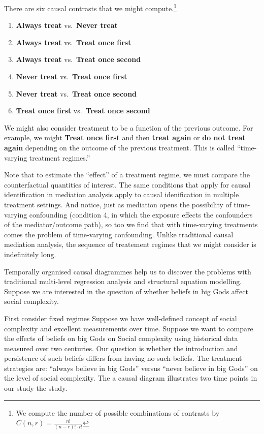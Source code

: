 \documentclass[
  singlecolumn]{report}
\providecommand{\tightlist}{%
  \setlength{\itemsep}{0pt}\setlength{\parskip}{0pt}}\usepackage{longtable,booktabs,array}
\begin{document}
There are six causal contrasts that we might compute.\footnote{We
  compute the number of possible combinations of contrasts by
  \(C(n, r) = \frac{n!}{(n-r)! \cdot r!}\)}

\begin{enumerate}
\def\labelenumi{\arabic{enumi}.}
\tightlist
\item
  \textbf{Always treat} vs.~\textbf{Never treat}
\item
  \textbf{Always treat} vs.~\textbf{Treat once first}
\item
  \textbf{Always treat} vs.~\textbf{Treat once second}
\item
  \textbf{Never treat} vs.~\textbf{Treat once first}
\item
  \textbf{Never treat} vs.~\textbf{Treat once second}
\item
  \textbf{Treat once first} vs.~\textbf{Treat once second}
\end{enumerate}

We might also consider treatment to be a function of the previous
outcome. For example, we might \textbf{Treat once first} and then
\textbf{treat again} or \textbf{do not treat again} depending on the
outcome of the previous treatment. This is called ``time-varying
treatment regimes.''

Note that to estimate the ``effect'' of a treatment regime, we must
compare the counterfactual quantities of interest. The same conditions
that apply for causal identification in mediation analysis apply to
causal idenification in multiple treatment settings. And notice, just as
mediation opens the possibility of time-varying confounding (condition
4, in which the exposure effects the confounders of the mediator/outcome
path), so too we find that with time-varying treatments comes the
problem of time-varying confounding. Unlike traditional causal mediation
analysis, the sequence of treatement regimes that we might consider is
indefinitely long.

Temporally organised causal diagrammes help us to discover the problems
with traditional multi-level regression analysis and structural equation
modelling. Suppose we are interested in the question of whether beliefs
in big Gods affect social complexity.

First consider fixed regimes Suppose we have well-defined concept of
social complexity and excellent measurements over time. Suppose we want
to compare the effects of beliefs on big Gods on Social complexity using
historical data measured over two centuries. Our question is whether the
introduction and persistence of such beliefs differs from having no such
beliefs. The treatment strategies are: ``always believe in big Gods''
versus ``never believe in big Gods'' on the level of social complexity.
The a causal diagram illustrates two time points in our study the study.
\end{document}
